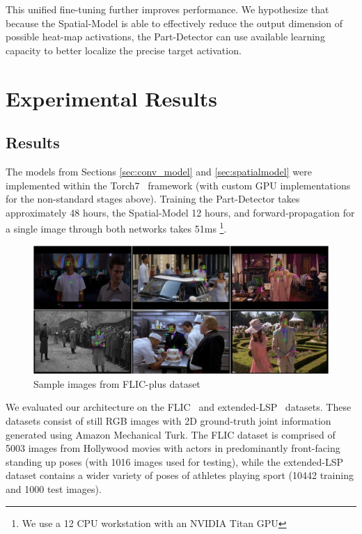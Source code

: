 This unified fine-tuning further improves performance. We hypothesize that because the Spatial-Model is able to effectively reduce the output dimension of possible heat-map activations, the Part-Detector can use available learning capacity to better localize the precise target activation.

\chapter{Experimental Results\label{chap:2_body_tracking_experimental}}

\section{Results}

The models from Sections \ref{sec:conv_model} and \ref{sec:spatialmodel} were implemented within the Torch7~\cite{torch7} framework (with custom GPU implementations for the non-standard stages above). Training the Part-Detector takes approximately 48 hours, the Spatial-Model 12 hours, and forward-propagation for a single image through both networks takes 51ms \footnote{We use a 12 CPU workstation with an NVIDIA Titan GPU}.

\begin{figure}[th]
  \centering
    \includegraphics[width=\columnwidth]{figures_2_body_tracking/flic_plus_sample}
    \caption{Sample images from FLIC-plus dataset}
  \label{fig:flic_plus}
\end{figure}

We evaluated our architecture on the FLIC~\cite{modec} and extended-LSP~\cite{Johnson10} datasets. These datasets consist of still RGB images with 2D ground-truth joint information generated using Amazon Mechanical Turk. The FLIC dataset is comprised of 5003 images from Hollywood movies with actors in predominantly front-facing standing up poses (with 1016 images used for testing), while the extended-LSP dataset contains a wider variety of poses of athletes playing sport (10442 training and 1000 test images).

